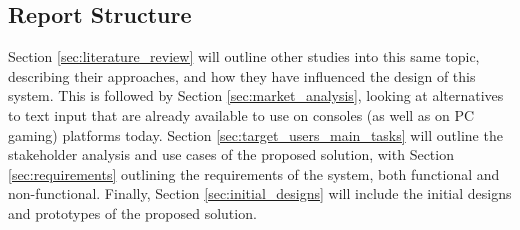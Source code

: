 \documentclass[requirements.tex]{subfiles}
\begin{document}
\subsection{Report Structure} %
\label{sub:report_structure}

Section \ref{sec:literature_review} will outline other studies into this same
topic, describing their approaches, and how they have influenced the design of
this system.
This is followed by Section \ref{sec:market_analysis}, looking at alternatives
to text input that are already available to use on consoles (as well as on PC
gaming) platforms today.
Section \ref{sec:target_users_main_tasks} will outline the stakeholder analysis
and use cases of the proposed solution, with Section \ref{sec:requirements}
outlining the requirements of the system, both functional and non-functional.
Finally, Section \ref{sec:initial_designs} will include the initial designs and
prototypes of the proposed solution.

\newpage
\end{document}
